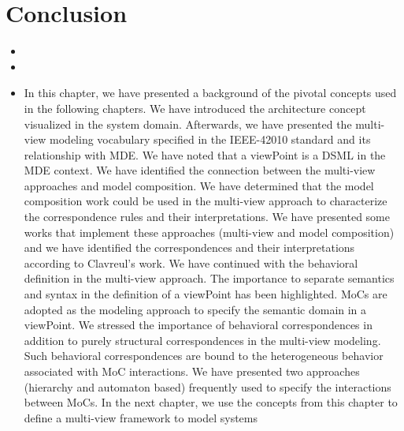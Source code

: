 \section{Conclusion}
	\begin{itemize}
			\item {}
			
			\item {}
			
		\item In this chapter, we have presented a background of the pivotal concepts used in the
		following chapters. We have introduced the architecture concept visualized in the system
		domain. Afterwards, we have presented the multi-view modeling vocabulary specified
		in the IEEE-42010 standard and its relationship with MDE. We have noted that
		a viewPoint is a DSML in the MDE context. We have identified the connection between
		the multi-view approaches and model composition. We have determined that
		the model composition work could be used in the multi-view approach to characterize
		the correspondence rules and their interpretations. We have presented some works that
		implement these approaches (multi-view and model composition) and we have identified
		the correspondences and their interpretations according to Clavreul’s work.
		We have continued with the behavioral definition in the multi-view approach. The
		importance to separate semantics and syntax in the definition of a viewPoint has been
		highlighted. MoCs are adopted as the modeling approach to specify the semantic domain
		in a viewPoint. We stressed the importance of behavioral correspondences in addition
		to purely structural correspondences in the multi-view modeling. Such behavioral correspondences
		are bound to the heterogeneous behavior associated with MoC interactions.
		We have presented two approaches (hierarchy and automaton based) frequently used to
		specify the interactions between MoCs.
		In the next chapter, we use the concepts from this chapter to define a multi-view framework
		to model systems
	\end{itemize}


